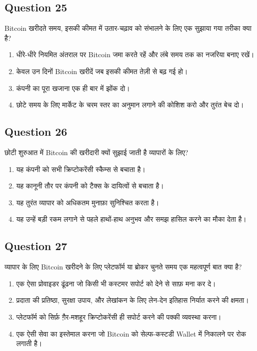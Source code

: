 \documentclass[12pt,a4paper]{article}
\begin{document}
\bigskip


\subsection*{Question 25}
Bitcoin खरीदते समय, इसकी कीमत में उतार-चढ़ाव को संभालने के लिए एक सुझाया गया तरीका क्या है?

\begin{enumerate}[label=\Alph*., leftmargin=*]
\item धीरे-धीरे नियमित अंतराल पर Bitcoin जमा करते रहें और लंबे समय तक का नजरिया बनाए रखें।
\item केवल उन दिनों Bitcoin खरीदें जब इसकी कीमत तेज़ी से बढ़ गई हो।
\item कंपनी का पूरा खजाना एक ही बार में झोंक दो।
\item छोटे समय के लिए मार्केट के चरम स्तर का अनुमान लगाने की कोशिश करो और तुरंत बेच दो।
\end{enumerate}

\bigskip


\subsection*{Question 26}
छोटी शुरुआत में Bitcoin की खरीदारी क्यों सुझाई जाती है व्यापारों के लिए?

\begin{enumerate}[label=\Alph*., leftmargin=*]
\item यह कंपनी को सभी क्रिप्टोकरेंसी स्कैम्स से बचाता है।
\item यह कानूनी तौर पर कंपनी को टैक्स के दायित्वों से बचाता है।
\item यह तुरंत व्यापार को अधिकतम मुनाफ़ा सुनिश्चित करता है।
\item यह उन्हें बड़ी रकम लगाने से पहले हाथों-हाथ अनुभव और समझ हासिल करने का मौका देता है।
\end{enumerate}

\bigskip


\subsection*{Question 27}
व्यापार के लिए Bitcoin खरीदने के लिए प्लेटफॉर्म या ब्रोकर चुनते समय एक महत्वपूर्ण बात क्या है?

\begin{enumerate}[label=\Alph*., leftmargin=*]
\item एक ऐसा प्रोवाइडर ढूंढना जो किसी भी कस्टमर सपोर्ट को देने से साफ़ मना कर दे।
\item प्रदाता की प्रतिष्ठा, सुरक्षा उपाय, और लेखांकन के लिए लेन-देन इतिहास निर्यात करने की क्षमता।
\item प्लेटफॉर्म को सिर्फ़ ग़ैर-मशहूर क्रिप्टोकरेंसी ही सपोर्ट करने की पक्की व्यवस्था करना।
\item एक ऐसी सेवा का इस्तेमाल करना जो Bitcoin को सेल्फ-कस्टडी Wallet में निकालने पर रोक लगाती है।
\end{enumerate}
\end{document}

